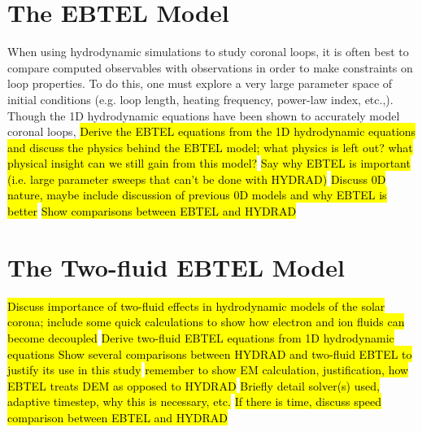\section{The EBTEL Model}
\label{sec:ebtel}
When using hydrodynamic simulations to study coronal loops, it is often best to compare computed observables with observations in order to make constraints on loop properties. To do this, one must explore a very large parameter space of initial conditions (e.g. loop length, heating frequency, power-law index, etc.,). Though the 1D hydrodynamic equations have been shown to accurately model coronal loops,
\hl{Derive the EBTEL equations from the 1D hydrodynamic equations and discuss the physics behind the EBTEL model; what physics is left out? what physical insight can we still gain from this model?}
\hl{Say why EBTEL is important (i.e. large parameter sweeps that can't be done with HYDRAD)}
\hl{Discuss 0D nature, maybe include discussion of previous 0D models and why EBTEL is better}
\hl{Show comparisons between EBTEL and HYDRAD}
\section{The Two-fluid EBTEL Model}
\label{sec:ebtel2fl}
\hl{Discuss importance of two-fluid effects in hydrodynamic models of the solar corona; include some quick calculations to show how electron and ion fluids can become decoupled}
\hl{Derive two-fluid EBTEL equations from 1D hydrodynamic equations
Show several comparisons between HYDRAD and two-fluid EBTEL to justify its use in this study}
\hl{remember to show EM calculation, justification, how EBTEL treats DEM as opposed to HYDRAD}
\hl{Briefly detail solver(s) used, adaptive timestep, why this is necessary, etc.}
\hl{If there is time, discuss speed comparison between EBTEL and HYDRAD}
